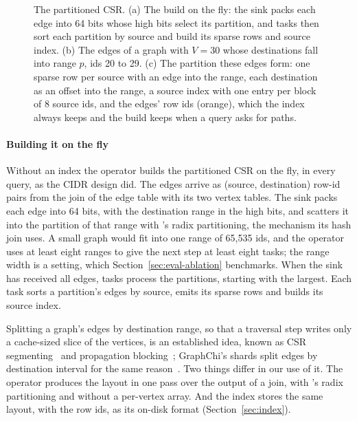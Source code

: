 \begin{figure}[t]
  \centering
  
  \caption{The partitioned CSR. (a) The build on the fly: the sink packs each edge into 64 bits whose high bits
  select its partition, and tasks then sort each partition by source and build its sparse rows and source index.
  (b) The edges of a graph with $V = 30$ whose destinations fall into range $p$, ids 20 to 29. (c) The partition these
  edges form: one sparse row per source with an edge into the range, each destination as an offset into the range, a
  source index with one entry per block of 8 source ids, and the edges' row ids (orange), which the index always
  keeps and the build keeps when a query asks for paths.}
  \label{fig:partitioned-csr}
\end{figure}

\paragraph{Building it on the fly} Without an index the operator builds the partitioned CSR on the fly, in every
query, as the CIDR design did. The edges arrive as (source, destination) row-id pairs from the join of the edge table
with its two vertex tables. The sink packs each edge into 64 bits, with the destination range in the high bits, and
scatters it into the partition of that range with \duckdb's radix partitioning, the mechanism its hash join uses. A
small graph would fit into one range of 65,535 ids, and the operator uses at least eight ranges to give the next
step at least eight tasks; the range width is a setting, which Section~\ref{sec:eval-ablation} benchmarks. When the
sink has received all edges, tasks process the partitions, starting with the largest. Each task sorts a partition's
edges by source, emits its sparse rows and builds its source index.

Splitting a graph's edges by destination range, so that a traversal step writes only a cache-sized slice of the
vertices, is an established idea, known as CSR segmenting~\cite{zhang2017cagra} and propagation
blocking~\cite{beamer2017blocking}; GraphChi's shards split edges by destination interval for the same
reason~\cite{kyrola2012graphchi}. Two things differ in our use of it. The operator produces the layout in one pass
over the output of a join, with \duckdb's radix partitioning and without a per-vertex array. And the index stores the
same layout, with the row ids, as its on-disk format (Section~\ref{sec:index}).

